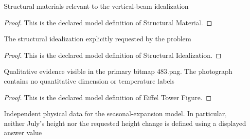 \begin{definition}
  \label{def:physics:phyx-mini-0483:phyxminiproblems-problemphyxmini0483-structuralmaterial}
  Structural materials relevant to the vertical-beam idealization
\end{definition}
\begin{proof}
  This is the declared model definition of Structural Material.
\end{proof}
\begin{definition}
  \label{def:physics:phyx-mini-0483:phyxminiproblems-problemphyxmini0483-structuralidealization}
  The structural idealization explicitly requested by the problem
\end{definition}
\begin{proof}
  This is the declared model definition of Structural Idealization.
\end{proof}
\begin{definition}
  \label{def:physics:phyx-mini-0483:phyxminiproblems-problemphyxmini0483-eiffeltowerfigure}
  Qualitative evidence visible in the primary bitmap 483.png. The photograph contains no quantitative dimension or temperature labels
\end{definition}
\begin{proof}
  This is the declared model definition of Eiffel Tower Figure.
\end{proof}
\begin{definition}
  \label{def:physics:phyx-mini-0483:phyxminiproblems-problemphyxmini0483-eiffeltowersetup}
  Independent physical data for the seasonal-expansion model. In particular, neither July's height nor the requested height change is defined using a displayed answer value
\end{definition}

